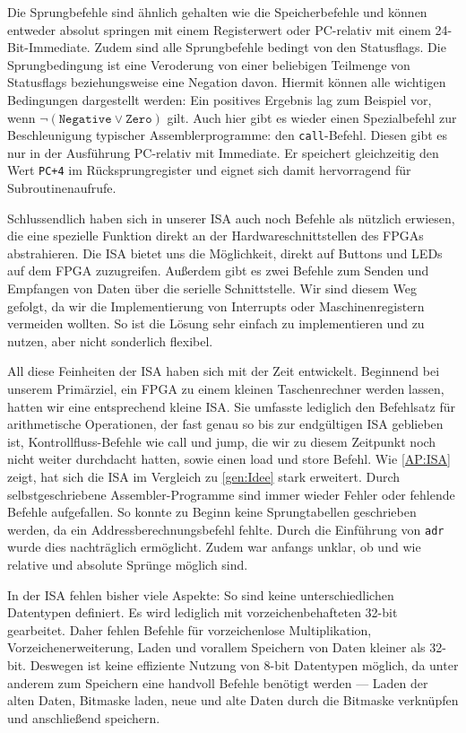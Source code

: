 Die Sprungbefehle sind ähnlich gehalten wie die Speicherbefehle und
können entweder absolut springen mit einem Registerwert oder PC-relativ mit einem 24-Bit-Immediate.
Zudem sind alle Sprungbefehle bedingt von den Statusflags.
Die Sprungbedingung ist eine Veroderung von einer beliebigen Teilmenge von Statusflags beziehungsweise eine Negation davon.
Hiermit können alle wichtigen Bedingungen dargestellt werden:
Ein positives Ergebnis lag zum Beispiel vor, wenn $\neg (\texttt{Negative} \lor \texttt{Zero})$ gilt.
Auch hier gibt es wieder einen Spezialbefehl zur Beschleunigung typischer Assemblerprogramme: den \texttt{call}-Befehl.
Diesen gibt es nur in der Ausführung PC-relativ mit Immediate.
Er speichert gleichzeitig den Wert \texttt{PC+4} im Rücksprungregister und
eignet sich damit hervorragend für Subroutinenaufrufe.

Schlussendlich haben sich in unserer ISA auch noch Befehle als nützlich erwiesen,
die eine spezielle Funktion direkt an der Hardwareschnittstellen des FPGAs abstrahieren.
Die ISA bietet uns die Möglichkeit, direkt auf Buttons und LEDs auf dem FPGA zuzugreifen.
Außerdem gibt es zwei Befehle zum Senden und Empfangen von Daten über die serielle Schnittstelle.
Wir sind diesem Weg gefolgt, da wir die Implementierung von Interrupts oder Maschinenregistern vermeiden wollten.
So ist die Lösung sehr einfach zu implementieren und zu nutzen, aber nicht sonderlich flexibel.

All diese Feinheiten der ISA haben sich mit der Zeit entwickelt.
Beginnend bei unserem Primärziel, ein FPGA zu einem kleinen Taschenrechner werden lassen, hatten wir eine entsprechend kleine ISA\@.
Sie umfasste lediglich den Befehlsatz für arithmetische Operationen, der fast genau so bis zur endgültigen ISA geblieben ist,
Kontrollfluss-Befehle wie call und jump, die wir zu diesem Zeitpunkt noch nicht weiter durchdacht hatten, sowie einen load und store Befehl.
Wie \autoref{AP:ISA} zeigt, hat sich die ISA im Vergleich zu \autoref{gen:Idee} stark erweitert.
Durch selbstgeschriebene Assembler-Programme sind immer wieder Fehler oder fehlende Befehle aufgefallen.
So konnte zu Beginn keine Sprungtabellen geschrieben werden, da ein Addressberechnungsbefehl fehlte.
Durch die Einführung von \texttt{adr} wurde dies nachträglich ermöglicht.
Zudem war anfangs unklar, ob und wie relative und absolute Sprünge möglich sind.

In der ISA fehlen bisher viele Aspekte:
So sind keine unterschiedlichen Datentypen definiert. Es wird lediglich mit vorzeichenbehafteten 32-bit gearbeitet.
Daher fehlen Befehle für vorzeichenlose Multiplikation, Vorzeichenerweiterung, Laden und vorallem Speichern von Daten kleiner als 32-bit.
Deswegen ist keine effiziente Nutzung von 8-bit Datentypen möglich, da unter anderem zum Speichern eine handvoll Befehle benötigt werden --- Laden der alten Daten,
Bitmaske laden, neue und alte Daten durch die Bitmaske verknüpfen und anschließend speichern.

